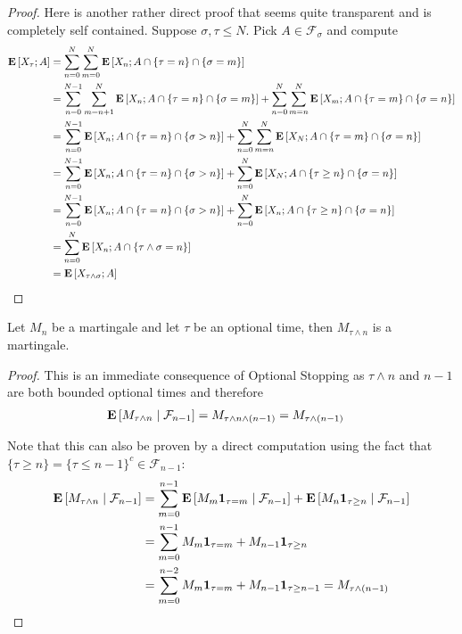 \begin{proof}
Here is another rather direct proof that seems quite transparent and
is completely self contained.
Suppose $\sigma, \tau \leq N$.  Pick $A \in \mathcal{F}_\sigma$ and
compute
\begin{align*}
\expectation{X_\tau ; A} &= \sum_{n=0}^N \sum_{m=0}^N \expectation{X_n
  ; A \cap \lbrace \tau = n \rbrace \cap \lbrace \sigma = m\rbrace} \\
&=\sum_{n=0}^{N-1} \sum_{m=n+1}^N \expectation{X_n
  ; A \cap \lbrace \tau = n \rbrace \cap \lbrace \sigma = m\rbrace} + \sum_{n=0}^{N} \sum_{m=n}^N \expectation{X_m
  ; A \cap \lbrace \tau = m \rbrace \cap \lbrace \sigma = n\rbrace}\\
&=\sum_{n=0}^{N-1} \expectation{X_n
  ; A \cap \lbrace \tau = n \rbrace \cap \lbrace \sigma > n\rbrace} + \sum_{n=0}^{N} \sum_{m=n}^N \expectation{X_N
  ; A \cap \lbrace \tau = m \rbrace \cap \lbrace \sigma = n\rbrace}\\
&=\sum_{n=0}^{N-1} \expectation{X_n ; A \cap \lbrace \tau = n \rbrace
  \cap \lbrace \sigma > n\rbrace} + 
\sum_{n=0}^{N} \expectation{X_N  ; A \cap \lbrace \tau \geq n \rbrace \cap \lbrace \sigma = n\rbrace}\\
&=\sum_{n=0}^{N-1} \expectation{X_n ; A \cap \lbrace \tau = n \rbrace
  \cap \lbrace \sigma > n\rbrace} + 
\sum_{n=0}^{N} \expectation{X_n  ; A \cap \lbrace \tau \geq n \rbrace
  \cap \lbrace \sigma = n\rbrace}\\
&=\sum_{n=0}^{N} \expectation{X_n  ; A \cap \lbrace \tau \wedge \sigma = n \rbrace}\\
&=\expectation{X_{\tau \wedge \sigma} ; A}
\end{align*}
\end{proof}

\begin{cor}Let $M_n$ be a martingale and let $\tau$ be an optional
  time, then $M_{\tau \wedge n}$ is a martingale.
\end{cor}
\begin{proof}
This is an immediate consequence of Optional Stopping as $\tau \wedge
n$ and $n-1$ are both bounded optional times and therefore 
\begin{align*}
\cexpectationlong{\mathcal{F}_{n-1}}{M_{\tau \wedge n}} &= M_{\tau
  \wedge n \wedge (n-1)} = M_{\tau \wedge (n-1)}
\end{align*}

Note that this can also be proven by a direct computation using the
fact that $\lbrace \tau \geq n \rbrace = \lbrace \tau \leq n-1
\rbrace^c \in \mathcal{F}_{n-1}$:
\begin{align*}
\cexpectationlong{\mathcal{F}_{n-1}}{M_{\tau \wedge n}} &=
\sum_{m=0}^{n-1} \cexpectationlong{\mathcal{F}_{n-1}}{M_m
  \characteristic{\tau=m}} + \cexpectationlong{\mathcal{F}_{n-1}}{M_n
\characteristic{\tau \geq n}} \\
&= \sum_{m=0}^{n-1} M_m  \characteristic{\tau=m} + M_{n-1}
\characteristic{\tau \geq n} \\
&= \sum_{m=0}^{n-2} M_m  \characteristic{\tau=m} + M_{n-1}
\characteristic{\tau \geq n-1} = M_{\tau \wedge (n-1)}\\
\end{align*}
\end{proof}


